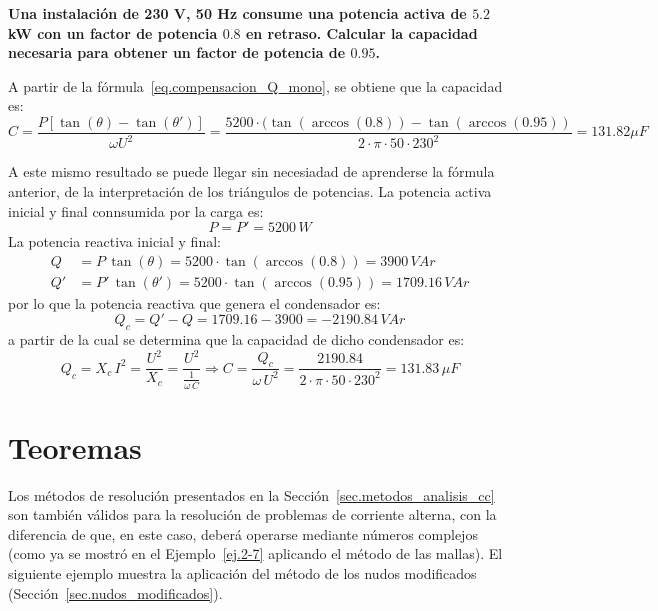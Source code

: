	\begin{example}\label{ex.condensador_Q}
	    \textbf{Una instalación de 230 V, 50 Hz consume una potencia activa de $5.2$ kW con un factor de potencia $0.8$ en retraso. Calcular la capacidad necesaria para obtener un factor de potencia de $0.95$.}
	    
	    A partir de la fórmula~\eqref{eq.compensacion_Q_mono}, se obtiene que la capacidad es:
	    \begin{equation*}
	        C=\frac{P \left[\tan (\theta) - \tan (\theta')\right]}{\omega U^2}=\dfrac{5200\cdot(\tan(\arccos(0.8))-\tan(\arccos(0.95))}{2\cdot\pi\cdot 50\cdot 230^2}=131.82\mu F
	    \end{equation*}
	    
	    A este mismo resultado se puede llegar sin necesiadad de aprenderse la fórmula anterior, de la interpretación de los triángulos de potencias. La potencia activa inicial y final connsumida por la carga es:
	    \begin{equation*}
	        P=P'=5200\,W
	    \end{equation*}
	    La potencia reactiva inicial y final:
	    \begin{align*}
	        Q&=P\,\tan(\theta)=5200\cdot\tan(\arccos(0.8))=3900\,VAr\\
	        Q'&=P'\,\tan(\theta')=5200\cdot\tan(\arccos(0.95))=1709.16\,VAr
	    \end{align*}
	    por lo que la potencia reactiva que genera el condensador es: 
	    \begin{equation*}
	        Q_c=Q'-Q=1709.16-3900=-2190.84\,VAr
	    \end{equation*}
	    a partir de la cual se determina que la capacidad de dicho condensador es:
	    \begin{equation*}
	        Q_c=X_c\,I^2=\dfrac{U^2}{X_c}=\dfrac{U^2}{\frac{1}{\omega\,C}}\Rightarrow C=\dfrac{Q_c}{\omega\,U^2}=\dfrac{2190.84}{2\cdot\pi\cdot 50\cdot 230^2}=131.83\,\mu F
	    \end{equation*}
	\end{example}
	
	\section{Teoremas}
	
	Los métodos de resolución presentados en la Sección~\ref{sec.metodos_analisis_cc} son también válidos para la resolución de problemas de corriente alterna, con la diferencia de que, en este caso, deberá operarse mediante números complejos (como ya se mostró en el Ejemplo~\ref{ej.2-7} aplicando el método de las mallas). El siguiente ejemplo muestra la aplicación del método de los nudos modificados (Sección~\ref{sec.nudos_modificados}).
	
